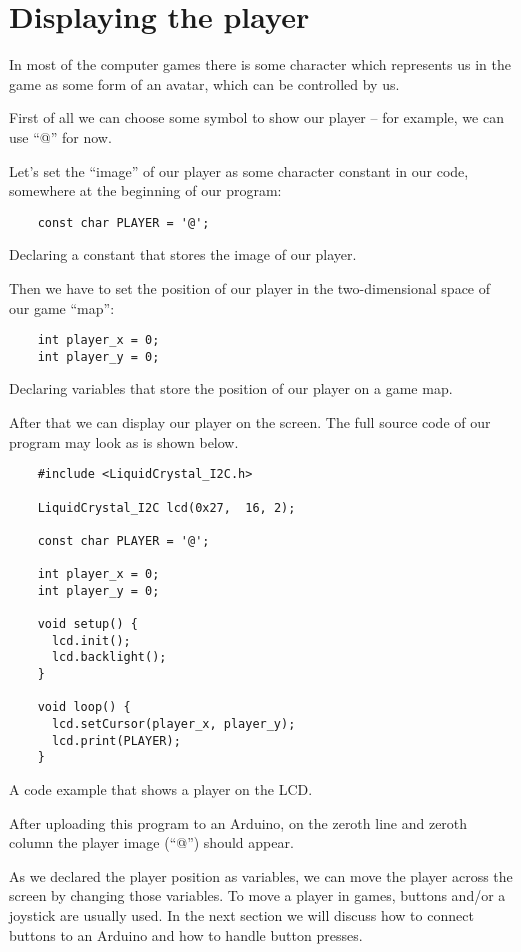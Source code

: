 \documentclass[../sparc.tex]{subfiles}
\begin{document}
\section{Displaying the player}
\label{section:player}

In most of the computer games there is some character which represents us in the
game as some form of an avatar, which can be controlled by us.

First of all we can choose some symbol to show our player -- for example, we can
use ``@'' for now.

Let's set the ``image'' of our player as some character constant in our code,
somewhere at the beginning of our program:

\begin{listing}[ht]
  \begin{verbatim}
    const char PLAYER = '@';
  \end{verbatim}
  \caption{Declaring a constant that stores the image of our player.}
  \label{listing:game-dev-player-image}
\end{listing}

Then we have to set the position of our player in the two-dimensional space of
our game ``map'':

\begin{listing}[ht]
  \begin{verbatim}
    int player_x = 0;
    int player_y = 0;
  \end{verbatim}
  \caption{Declaring variables that store the position of our player on a game
    map.}
  \label{listing:game-dev-player-position}
\end{listing}

After that we can display our player on the screen.  The full source code of our
program may look as is shown below.

\begin{listing}[ht]
  \begin{verbatim}
    #include <LiquidCrystal_I2C.h>

    LiquidCrystal_I2C lcd(0x27,  16, 2);

    const char PLAYER = '@';

    int player_x = 0;
    int player_y = 0;

    void setup() {
      lcd.init();
      lcd.backlight();
    }

    void loop() {
      lcd.setCursor(player_x, player_y);
      lcd.print(PLAYER);
    }
  \end{verbatim}
  \caption{A code example that shows a player on the LCD.}
  \label{listing:game-dev-player-example}
\end{listing}

After uploading this program to an Arduino, on the zeroth line and zeroth column
the player image (``@'') should appear.

As we declared the player position as variables, we can move the player across
the screen by changing those variables.  To move a player in games, buttons
and/or a joystick are usually used.  In the next section we will discuss how to
connect buttons to an Arduino and how to handle button presses.
\end{document}
